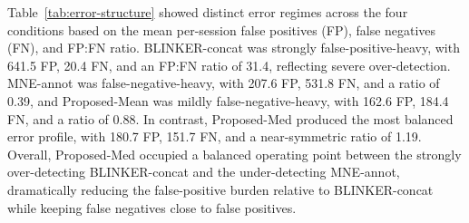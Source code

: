 Table~\ref{tab:error-structure} showed distinct error regimes across the four conditions based on the mean per-session false positives (FP), false negatives (FN), and FP:FN ratio. BLINKER-concat was strongly false-positive-heavy, with 641.5 FP, 20.4 FN, and an FP:FN ratio of 31.4, reflecting severe over-detection. MNE-annot was false-negative-heavy, with 207.6 FP, 531.8 FN, and a ratio of 0.39, and Proposed-Mean was mildly false-negative-heavy, with 162.6 FP, 184.4 FN, and a ratio of 0.88. In contrast, Proposed-Med produced the most balanced error profile, with 180.7 FP, 151.7 FN, and a near-symmetric ratio of 1.19. Overall, Proposed-Med occupied a balanced operating point between the strongly over-detecting BLINKER-concat and the under-detecting MNE-annot, dramatically reducing the false-positive burden relative to BLINKER-concat while keeping false negatives close to false positives.
